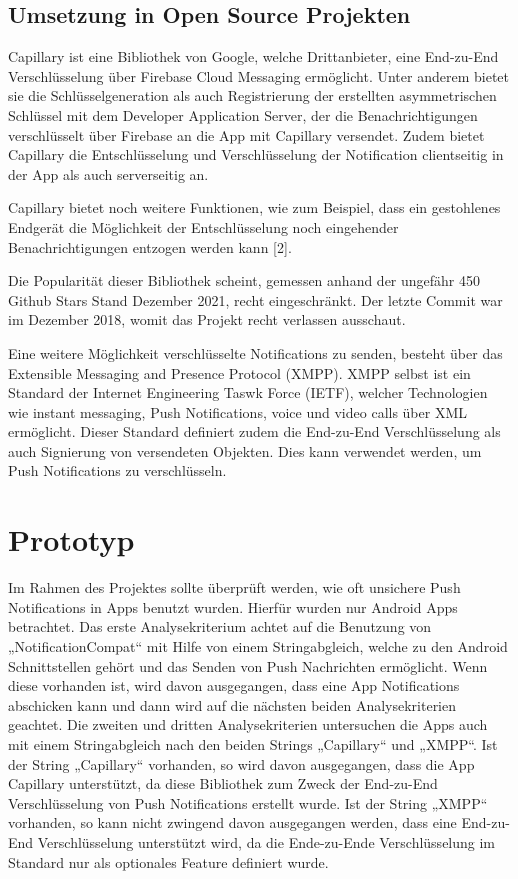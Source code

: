 \documentclass[sigconf]{acmart}
\begin{document}
\subsection{Umsetzung in Open Source Projekten}

Capillary ist eine Bibliothek von Google, welche Drittanbieter, eine End-zu-End 
Verschlüsselung über Firebase Cloud Messaging ermöglicht. Unter anderem 
bietet sie die Schlüsselgeneration als auch Registrierung der erstellten 
asymmetrischen Schlüssel mit dem Developer Application Server, der die 
Benachrichtigungen verschlüsselt über Firebase an die App mit Capillary 
versendet. Zudem bietet Capillary die Entschlüsselung und Verschlüsselung 
der Notification clientseitig in der App als auch serverseitig an.

Capillary bietet noch weitere Funktionen, wie zum Beispiel, dass ein gestohlenes 
Endgerät die Möglichkeit der Entschlüsselung noch eingehender Benachrichtigungen 
entzogen werden kann [2].

Die Popularität dieser Bibliothek scheint, gemessen anhand der ungefähr 
450 Github Stars Stand Dezember 2021, recht eingeschränkt. Der letzte Commit 
war im Dezember 2018, womit das Projekt recht verlassen ausschaut.

Eine weitere Möglichkeit verschlüsselte Notifications zu senden, 
besteht über das Extensible Messaging and Presence Protocol (XMPP). 
XMPP selbst ist ein Standard der Internet Engineering Taswk Force (IETF), 
welcher Technologien wie instant messaging, Push Notifications, voice und 
video calls über XML ermöglicht. Dieser Standard definiert zudem die 
End-zu-End Verschlüsselung als auch Signierung von versendeten Objekten. 
Dies kann verwendet werden, um Push Notifications zu verschlüsseln.

\section{Prototyp}

Im Rahmen des Projektes sollte überprüft werden, wie oft unsichere Push 
Notifications in Apps benutzt wurden. Hierfür wurden nur Android Apps 
betrachtet. Das erste Analysekriterium achtet auf die Benutzung von 
„NotificationCompat“ mit Hilfe von einem Stringabgleich, welche zu den 
Android Schnittstellen gehört und das Senden von Push Nachrichten ermöglicht. 
Wenn diese vorhanden ist, wird davon ausgegangen, dass eine App 
Notifications abschicken kann und dann wird auf die nächsten beiden 
Analysekriterien geachtet.
Die zweiten und dritten Analysekriterien untersuchen die Apps auch mit 
einem Stringabgleich nach den beiden Strings „Capillary“ und „XMPP“. Ist 
der String „Capillary“ vorhanden, so wird davon ausgegangen, dass die App 
Capillary unterstützt, da diese Bibliothek zum Zweck der End-zu-End 
Verschlüsselung von Push Notifications erstellt wurde. Ist der String „XMPP“ 
vorhanden, so kann nicht zwingend davon ausgegangen werden, dass eine 
End-zu-End Verschlüsselung unterstützt wird, da die Ende-zu-Ende 
Verschlüsselung im Standard nur als optionales Feature definiert wurde.
\end{document}
